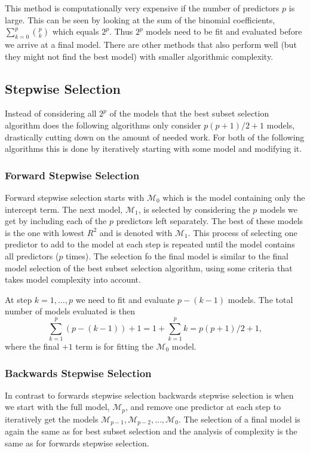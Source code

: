 \documentclass[a4paper, 12pt]{scrartcl}
\begin{document}
This method is computationally very expensive if the number of predictors $p$ is large.
This can be seen by looking at the sum of the binomial coefficients, $\sum_{k=0}^{p}{p \choose k}$ which equals $2^p$.
Thus $2^p$ models need to be fit and evaluated before we arrive at a final model.
There are other methods that also perform well (but they might not find the best model) with smaller algorithmic complexity.

\subsection{Stepwise Selection}
Instead of considering all $2^p$ of the models that the best subset selection  algorithm does the following algorithms only consider $p(p+1)/2+1$ models, drastically cutting down on the amount of needed work.
For both of the following algorithms this is done by iteratively starting with some model and modifying it.


\subsubsection*{Forward Stepwise Selection}
\begin{algorithm}
Forward stepwise selection starts with $\mathcal{M}_0$ which is the model containing only the intercept term.
The next model, $\mathcal{M}_1$, is selected by considering the $p$ models we get by including each of the $p$ predictors left separately.
The best of these models is the one with lowest $R^2$ and is denoted with $\mathcal{M}_1$.
This process of selecting one predictor to add to the model at each step is repeated until the model contains all predictors ($p$ times).
The selection fo the final model is similar to the final model selection of the best subset selection algorithm, using some criteria that takes model complexity into account.

At step $k=1,\ldots,p$ we need to fit and evaluate $p-(k-1)$ models.
The total number of models evaluated is then
\begin{equation*}
\sum_{k=1}^{p} \left(p-(k-1)\right) + 1=1+\sum_{k=1}^{p} k = p(p+1)/2+1,
\end{equation*}
where the final $+1$ term is for fitting the $\mathcal{M}_0$ model.
\end{algorithm}


\subsubsection*{Backwards Stepwise Selection}
\begin{algorithm}
In contrast to forwards stepwise selection backwards stepwise selection is when we start with the full model, $\mathcal{M}_p$, and remove one predictor at each step to iteratively get the models $\mathcal{M}_{p-1},\mathcal{M}_{p-2},\ldots,\mathcal{M}_0$.
The selection of a final model is again the same as for best subset selection and the analysis of complexity is the same as for forwards stepwise selection.
\end{algorithm}
\end{document}
